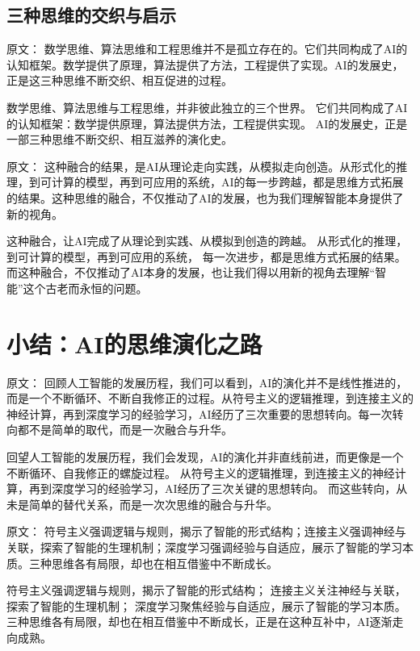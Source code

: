 \subsection{三种思维的交织与启示}

原文：
数学思维、算法思维和工程思维并不是孤立存在的。它们共同构成了AI的认知框架。数学提供了原理，算法提供了方法，工程提供了实现。AI的发展史，正是这三种思维不断交织、相互促进的过程。

数学思维、算法思维与工程思维，并非彼此独立的三个世界。  
它们共同构成了AI的认知框架：数学提供原理，算法提供方法，工程提供实现。  
AI的发展史，正是一部三种思维不断交织、相互滋养的演化史。

原文：
这种融合的结果，是AI从理论走向实践，从模拟走向创造。从形式化的推理，到可计算的模型，再到可应用的系统，AI的每一步跨越，都是思维方式拓展的结果。这种思维的融合，不仅推动了AI的发展，也为我们理解智能本身提供了新的视角。

这种融合，让AI完成了从理论到实践、从模拟到创造的跨越。  
从形式化的推理，到可计算的模型，再到可应用的系统，  
每一次进步，都是思维方式拓展的结果。  
而这种融合，不仅推动了AI本身的发展，也让我们得以用新的视角去理解“智能”这个古老而永恒的问题。

\section{小结：AI的思维演化之路}

原文：
回顾人工智能的发展历程，我们可以看到，AI的演化并不是线性推进的，而是一个不断循环、不断自我修正的过程。从符号主义的逻辑推理，到连接主义的神经计算，再到深度学习的经验学习，AI经历了三次重要的思想转向。每一次转向都不是简单的取代，而是一次融合与升华。

回望人工智能的发展历程，我们会发现，AI的演化并非直线前进，而更像是一个不断循环、自我修正的螺旋过程。  
从符号主义的逻辑推理，到连接主义的神经计算，再到深度学习的经验学习，AI经历了三次关键的思想转向。  
而这些转向，从未是简单的替代关系，而是一次次思维的融合与升华。

原文：
符号主义强调逻辑与规则，揭示了智能的形式结构；连接主义强调神经与关联，探索了智能的生理机制；深度学习强调经验与自适应，展示了智能的学习本质。三种思维各有局限，却也在相互借鉴中不断成长。

符号主义强调逻辑与规则，揭示了智能的形式结构；  
连接主义关注神经与关联，探索了智能的生理机制；  
深度学习聚焦经验与自适应，展示了智能的学习本质。  
三种思维各有局限，却也在相互借鉴中不断成长，正是在这种互补中，AI逐渐走向成熟。


